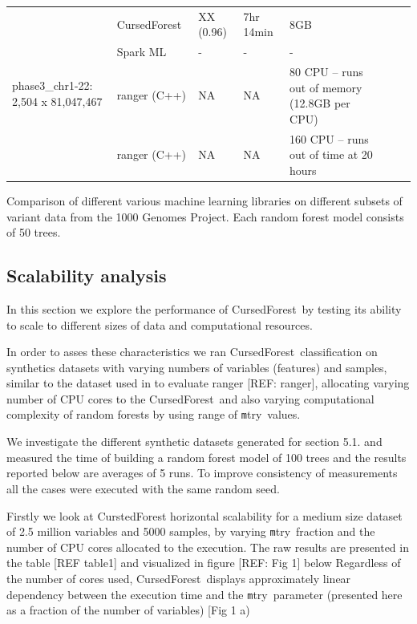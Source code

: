 \documentclass[10pt,letterpaper]{article}
\newcommand{\cursedforest}{{\sc CursedForest}}
\newcommand{\mtry}{{\texttt mtry}}
\begin{document}
\begin{table}[!ht]
\begin{minipage}{\textwidth}
\begin{adjustwidth}{-2.25in}{0in}
\begin{tabular}{|l|l|l|l|l|l|p{1cm}|}
\multirow{4}{*}{phase3\_chr1-22: 2,504 x 81,047,467} & \cursedforest\ & XX (0.96) & 7hr 14min & 8GB \\
& Spark ML & - & - & - \\
& ranger (C++)       &        NA     &        NA     &            80 CPU -- runs out of memory (12.8GB per CPU) \\
& ranger (C++)       &        NA     &        NA     &            160
                                                        CPU -- runs
                                                        out of time at
                                                        20 hours \\
\hline
\end{tabular}
\begin{flushleft} 
Comparison of different various machine learning libraries on different subsets of variant data 
from the 1000 Genomes Project.
Each random forest model consists of 50 trees.
\end{flushleft}
\label{table1}
\end{adjustwidth}
\end{minipage}
\end{table}


\subsection{Scalability analysis}

In this section we explore the performance of \cursedforest\ by testing its ability to scale to different sizes of data and computational resources.

In order to asses these characteristics we ran \cursedforest\ classification on synthetics datasets with varying numbers of variables (features) and samples, similar to the dataset used in to evaluate ranger [REF: ranger], allocating varying number of CPU cores to the \cursedforest\ and also varying computational complexity of random forests by using range of \mtry\ values.


We investigate the different synthetic datasets generated for section 5.1. and measured the time of building a random forest model of 100 trees and the results reported below are averages of 5 runs. To improve consistency of measurements all the cases were executed with the same random seed.

Firstly we look at CurstedForest horizontal scalability for a medium size dataset of 2.5 million variables and 5000 samples, by varying \mtry\ fraction and the number of CPU cores allocated to the execution. The raw results are presented in the table [REF table1] and visualized in figure [REF: Fig 1] below
Regardless of the number of cores used, \cursedforest\ displays approximately linear dependency between the execution time and the \mtry\ parameter (presented here as a fraction of the number of variables) [Fig 1 a)
\end{document}
